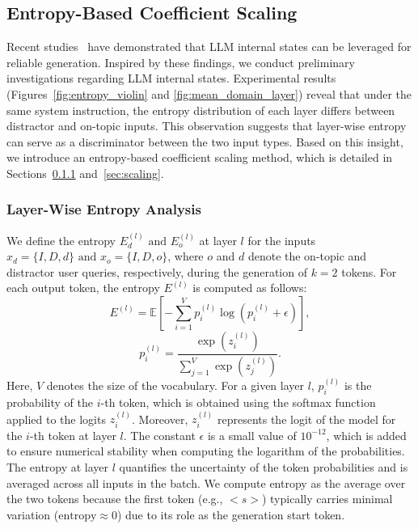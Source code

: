 \documentclass[11pt]{article}
\begin{document}
\subsection{Entropy-Based Coefficient Scaling}
Recent studies~\cite{chen2024inside,ji-etal-2024-llm,azaria-mitchell-2023-internal,chuang2024dola} have demonstrated that LLM internal states can be leveraged for reliable generation. Inspired by these findings, we conduct preliminary investigations regarding LLM internal states. Experimental results (Figures~\ref{fig:entropy_violin} and \ref{fig:mean_domain_layer}) reveal that under the same system instruction, the entropy distribution of each layer differs between distractor and on-topic inputs. This observation suggests that layer-wise entropy can serve as a discriminator between the two input types. Based on this insight, we introduce an entropy-based coefficient scaling method, which is detailed in Sections~\ref{sec:layer_entropy_analysis} and~\ref{sec:scaling}.


\subsubsection{Layer-Wise Entropy Analysis}\label{sec:layer_entropy_analysis}
We define the entropy \( E^{(l)}_d \text{ and } E^{(l)}_o \) at layer \( l \) for the inputs \( x_d = \{I, D, d\} \text{ and } x_o = \{I, D, o\} \), where \(o\) and \(d\) denote the on-topic and distractor user queries, respectively, during the generation of \( k=2 \) tokens. For each output token, the entropy \( E^{(l)}\) is computed as follows: 
\[
E^{(l)} = \mathbb{E}\left[- \sum_{i=1}^{V} p_i^{(l)} \log \left(p_i^{(l)} + \epsilon\right) \right],
\]
\[
p_i^{(l)} = \frac{\exp(z_i^{(l)})}{\sum_{j=1}^{V} \exp(z_j^{(l)})}.
\]
Here, $V$ denotes the size of the vocabulary. For a given layer \( l \), \( p_i^{(l)} \) is the probability of the \( i \)-th token, which is obtained using the softmax function applied to the logits \( z_i^{(l)} \). Moreover, \( z_i^{(l)} \) represents the logit of the model for the \( i \)-th token at layer \( l \). The constant \( \epsilon \) is a small value of \( 10^{-12} \), which is added to ensure numerical stability when computing the logarithm of the probabilities. The entropy at layer \( l \) quantifies the uncertainty of the token probabilities and is averaged across all inputs in the batch. We compute entropy as the average over the two tokens because the first token (e.g., \(<s>\)) typically carries minimal variation (\( \text{entropy} \approx 0 \)) due to its role as the generation start token. 
\end{document}
